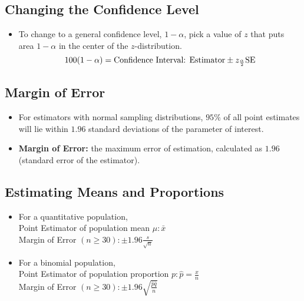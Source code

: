 \documentclass[12pt, letterpaper]{article}
\begin{document}
        \subsection*{Changing the Confidence Level}
            \begin{itemize}
                \item To change to a general confidence level, $1 - \alpha$, pick a value of $z$ that puts area $1 - \alpha$ in the center of the $z$-distribution. $$100(1 - \alpha) = \textnormal{Confidence Interval: Estimator} \pm z_{\frac{\alpha}{2}}\textnormal{SE}$$
            \end{itemize}
        \subsection*{Margin of Error}
            \begin{itemize}
                \item For estimators with normal sampling distributions, $95\%$ of all point estimates will lie within $1.96$ standard deviations of the parameter of interest.
                \item \textbf{Margin of Error:} the maximum error of estimation, calculated as $1.96$(standard error of the estimator).
            \end{itemize}
        \subsection{Estimating Means and Proportions}
            \begin{itemize}
                \item For a quantitative population, \\ Point Estimator of population mean $\mu : \bar{x}$ \\ Margin of Error $(n \geq 30): \pm 1.96\frac{s}{\sqrt{n}}$
                \item For a binomial population, \\ Point Estimator of population proportion $p : \hat{p} = \frac{x}{n}$ \\ Margin of Error $(n \geq 30) : \pm 1.96\sqrt{\frac{\hat{p}\hat{q}}{n}}$ 
            \end{itemize}
\end{document}
